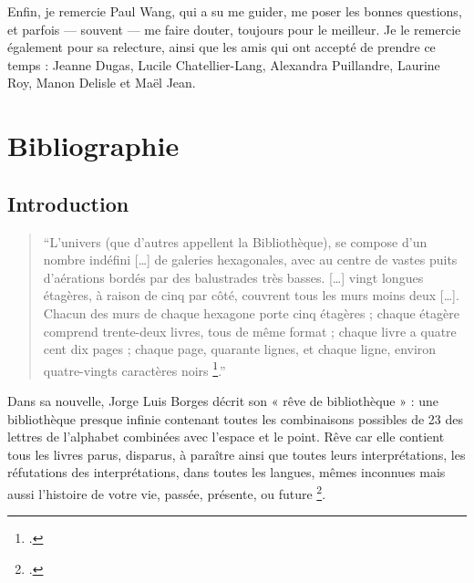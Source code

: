 \documentclass[a4paper,12pt,twoside]{book}
\begin{document}
	Enfin, je remercie Paul Wang, qui a su me guider, me poser les bonnes questions, et parfois — souvent — me faire douter, toujours pour le meilleur. Je le remercie également pour sa relecture, ainsi que les amis qui ont accepté de prendre ce temps : Jeanne Dugas, Lucile Chatellier-Lang, Alexandra Puillandre, Laurine Roy, Manon Delisle et Maël Jean.
	
	\newpage{\pagestyle{empty}\cleardoublepage}
	
	\part*{Bibliographie}
	\printbibliography[keyword=partie1, title={Historique et enjeux}]
	\printbibliography[keyword=partie2, title={Nouvelles interfaces}]
	\printbibliography[keyword=partie3, title={Limites de la notion}]
	
	
	\printbibliography[keyword=dictionnaires, title={Encyclopédies et statistiques}]
	
	
	\chapter{Introduction}	
	 \begin{quote}
	 	\enquote{L’univers (que d’autres appellent la Bibliothèque), se compose d’un nombre indéfini […] de galeries hexagonales, avec au centre de vastes puits d’aérations bordés par des balustrades très basses. […] vingt longues étagères, à raison de cinq par côté, couvrent tous les murs moins deux […]. Chacun des murs de chaque hexagone porte cinq étagères ; chaque étagère comprend trente-deux livres, tous de même format ; chaque livre a quatre cent dix pages ; chaque page, quarante lignes, et chaque ligne, environ quatre-vingts caractères noirs \footcite[p. 1]{borges1963}.}
	 \end{quote} 
	
	Dans sa nouvelle, Jorge Luis Borges décrit son « rêve de bibliothèque » : une bibliothèque presque infinie contenant toutes les combinaisons possibles de 23 des lettres de l’alphabet combinées avec l’espace et le point. Rêve car elle contient tous les livres parus, disparus, à paraître ainsi que toutes leurs interprétations, les réfutations des interprétations, dans toutes les langues, mêmes inconnues mais aussi l’histoire de votre vie, passée, présente, ou future \footcite{marx}.
	
\end{document}
